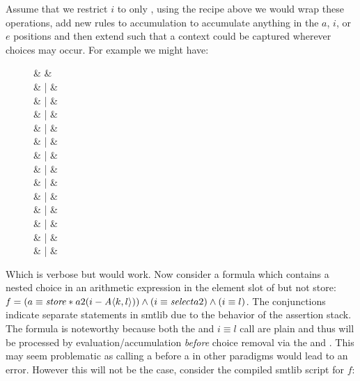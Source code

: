 Assume that we restrict $i$ to only , using the recipe above we would
wrap these operations, add new rules to accumulation to accumulate anything in
the $a$, $i$, or $e$ positions and then extend \zipper{} such that a context
could be captured wherever choices may occur. For example we might have:
%
\begin{figure}
  \centering
  \begin{syntax}
    \zipper & \Coloneqq{} & \inRoot  \\
    & | & \inNot{\zipper}            \\
    & | & \inUnary{\zipper}          \\
    & | & \inBoolL{\zipper}{\,\eIL}   \\
    & | &        \\
    & | & \inArithL{\zipper}{\,\eIL}  \\
    & | &       \\
    & | & \inInEqL{\zipper}{\,\eIL}   \\
    & | &        \\
    & | &  \\
    & | &  \\
    & | &  \\
    & | &  \\
    & | &  \\
  \end{syntax}
\end{figure}
%
Which is verbose but would work. Now consider a formula which contains a nested
choice in an arithmetic expression in the element slot of \select{} but not
store: $\kf{f} = (a \equiv \store*{a}{2}{(i - \chc[A]{k,l})}) \wedge (i \equiv
\select{a}{2}) \wedge (i \equiv l)$. The conjunctions indicate separate
statements in \acl{smtlib} due to the behavior of the assertion stack. The
formula is noteworthy because both the \select{} and $i \equiv l$ call are plain
and thus will be processed by evaluation/accumulation \emph{before} choice
removal via the \evAndL{} and \evAndR. This may seem problematic as calling a
\select{} before a \store{} in other paradigms would lead to an error. However
this will not be the case, consider the compiled \acl{smtlib} script for $f$:
%

